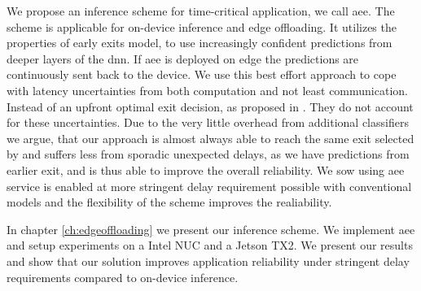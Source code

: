 We propose an inference scheme for time-critical application, we call \gls{aee}. The scheme is applicable for on-device inference and edge offloading. It utilizes the properties of early exits model, to use increasingly confident predictions from deeper layers of the \gls{dnn}. If \gls{aee} is deployed on edge the predictions are continuously sent back to the device. We use this best effort approach to cope with latency uncertainties from both computation and not least communication. Instead of an upfront optimal exit decision, as proposed in \cite{li_edge_2018}. They do not account for these uncertainties. Due to the very little overhead from additional classifiers we argue, that our approach is almost always able to reach the same exit selected by \cite{li_edge_2018} and suffers less from sporadic unexpected delays, as we have predictions from earlier exit, and is thus able to improve the overall reliability. We sow using \gls{aee} service is enabled at more stringent delay requirement possible with conventional models and the flexibility of the scheme improves the realiability. 

In chapter \ref{ch:edgeoffloading} we present our inference scheme. We implement \gls{aee} and setup experiments on a Intel NUC and a Jetson TX2. We present our results and show that our solution improves application reliability under stringent delay requirements compared to on-device inference.